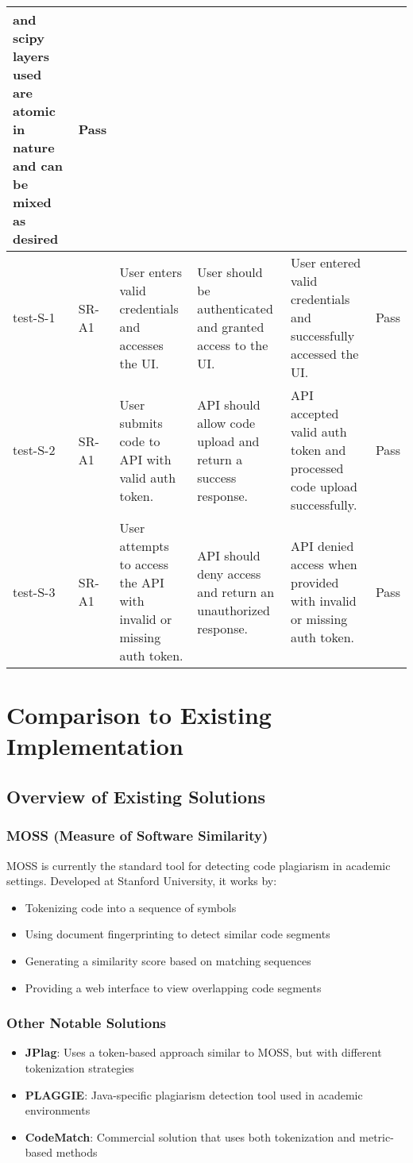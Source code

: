 \documentclass[12pt, titlepage]{article}
\begin{document}
\begin{longtable}[c]{|p{1.5cm}|p{1.5cm}|p{2.5cm}|p{2.5cm}|p{2.5cm}|p{1.5cm}|}
    and scipy layers used are atomic in nature and can be mixed as desired & Pass \\
    \hline
    test-S-1 & SR-A1 & User enters valid credentials and accesses the UI. & User 
    should be authenticated and granted access to the UI. & User entered valid 
    credentials and successfully accessed the UI. & Pass \\
    \hline
    test-S-2 & SR-A1 & User submits code to API with valid auth token. & API 
    should allow code upload and return a success response. & API accepted 
    valid auth token and processed code upload successfully. & Pass \\
    \hline
    test-S-3 & SR-A1 & User attempts to access the API with invalid or missing 
    auth token. & API should deny access and return an unauthorized response. 
    & API denied access when provided with invalid or missing auth token. & Pass \\
    \hline
    \end{longtable}
	
\section{Comparison to Existing Implementation}	

\subsection{Overview of Existing Solutions}

\subsubsection{MOSS (Measure of Software Similarity)}
MOSS is currently the standard tool for detecting code plagiarism in academic settings. Developed at Stanford University, it works by:
\begin{itemize}
    \item Tokenizing code into a sequence of symbols
    \item Using document fingerprinting to detect similar code segments
    \item Generating a similarity score based on matching sequences
    \item Providing a web interface to view overlapping code segments
\end{itemize}

\subsubsection{Other Notable Solutions}
\begin{itemize}
    \item \textbf{JPlag}: Uses a token-based approach similar to MOSS, but with different tokenization strategies
    \item \textbf{PLAGGIE}: Java-specific plagiarism detection tool used in academic environments
    \item \textbf{CodeMatch}: Commercial solution that uses both tokenization and metric-based methods
\end{itemize}
\end{document}
